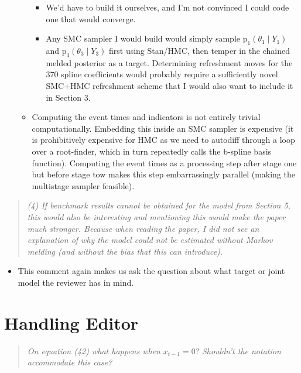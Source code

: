 \documentclass[
  10pt,
  a4paper,
]{article}
\providecommand{\tightlist}{%
  \setlength{\itemsep}{0pt}\setlength{\parskip}{0pt}}
\newcommand{\pd}{\text{p}}
\begin{document}
\begin{itemize}
\begin{itemize}
    \begin{itemize}
    \tightlist
    \item
      We'd have to build it ourselves, and I'm not convinced I could
      code one that would converge.
    \item
      Any SMC sampler I would build would simply sample
      \(\pd_{1}(\theta_{1} \mid Y_{1})\) and
      \(\pd_{3}(\theta_{3} \mid Y_{3})\) first using Stan/HMC, then
      temper in the chained melded posterior as a target. Determining
      refreshment moves for the \(370\) spline coefficients would
      probably require a sufficiently novel SMC+HMC refreshment scheme
      that I would also want to include it in Section 3.
    \end{itemize}
  \item
    Computing the event times and indicators is not entirely trivial
    computationally. Embedding this inside an SMC sampler is expensive
    (it is prohibitively expensive for HMC as we need to autodiff
    through a loop over a root-finder, which in turn repeatedly calls
    the b-spline basis function). Computing the event times as a
    processing step after stage one but before stage tow makes this step
    embarrassingly parallel (making the multistage sampler feasible).
  \end{itemize}
\end{itemize}

\begin{quote}
\emph{(4) If benchmark results cannot be obtained for the model from
Section 5, this would also be interesting and mentioning this would make
the paper much stronger. Because when reading the paper, I did not see
an explanation of why the model could not be estimated without Markov
melding (and without the bias that this can introduce).}
\end{quote}

\begin{itemize}
\tightlist
\item
  This comment again makes us ask the question about what target or
  joint model the reviewer has in mind.
\end{itemize}

\hypertarget{handling-editor}{%
\section{Handling Editor}\label{handling-editor}}

\begin{quote}
\emph{On equation (42) what happens when} \(x_{t - 1} = 0\)?
\emph{Shouldn't the notation accommodate this case?}
\end{quote}
\end{document}
